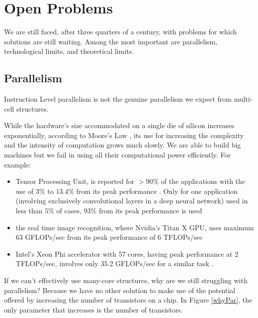 \chapter{Open Problems}\label{lect7}



We are still faced, after three quarters of a century, with problems for which solutions are still waiting. Among the most important are parallelism, technological limits, and theoretical limits.

\section{Parallelism}



Instruction Level parallelism is not the genuine parallelism we expect from multi-cell structures.

While the hardware's size accommodated on a single die of silicon increases exponentially, according to Moore's Law \citep{Moore65, Moore75}, its use for increasing the complexity and the intensity of computation grows much slowly. We are able to build big machines but we fail in using all their computational power efficiently. For example:
\begin{itemize}
    \item  Tensor Processing Unit, is reported for $>90\%$ of the applications  with the use of $3\%$ to $13.4\%$ from its peak performance \citep{Jouppi17} \citep{Hennessy19}. Only for one application (involving exclusively convolutional layers in a deep neural network) used in less than $5\%$ of cases, $93\%$ from its peak performance is used
    \item the real time image recognition, where Nvidia's Titan X GPU, uses maximum 63 GFLOPs/sec from its peak performance of 6 TFLOPs/sec \citep{Redmon16}
    \item Intel's Xeon Phi  accelerator with 57 cores, having  peak performance at 2 TFLOPs/sec, involves only 35.2 GFLOPs/sec for a similar task \citep{Raina16}.
\end{itemize}

If we can't effectively use many-core structures, why are we still struggling with parallelism? Because we have no other solution to make use of the potential offered by increasing the number of transistors on a chip. In Figure \ref{whyPar}, the only parameter that increases is the number of transistors.

